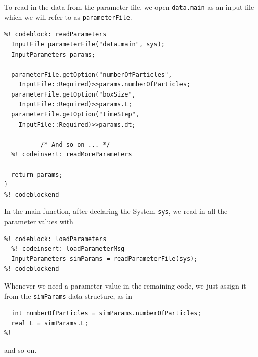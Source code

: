 To read in the data from the parameter file, we open \texttt{data.main} as an
input file which we will refer to as \texttt{parameterFile}.
\begin{lstlisting}
%! codeblock: readParameters
  InputFile parameterFile("data.main", sys);
  InputParameters params;

  parameterFile.getOption("numberOfParticles",
    InputFile::Required)>>params.numberOfParticles;
  parameterFile.getOption("boxSize",
    InputFile::Required)>>params.L;
  parameterFile.getOption("timeStep",
    InputFile::Required)>>params.dt;

          /* And so on ... */
  %! codeinsert: readMoreParameters

  return params;
}
%! codeblockend
\end{lstlisting}

In the main function, after declaring the System \texttt{sys}, we read in all
the parameter values with
\begin{lstlisting}
%! codeblock: loadParameters
  %! codeinsert: loadParameterMsg
  InputParameters simParams = readParameterFile(sys);
%! codeblockend
\end{lstlisting}
Whenever we need a parameter value in the remaining code, we just assign it from
the \texttt{simParams} data structure, as in
\begin{lstlisting}
  int numberOfParticles = simParams.numberOfParticles;
  real L = simParams.L;
%!
\end{lstlisting}
and so on.

